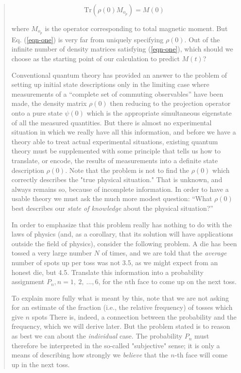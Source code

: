 \documentclass[]{article}
\begin{document}
\begin{quote}
\begin{equation}
\text{Tr}\left( \rho(0)M_{o_{p}} \right) = M(0) \label{eqn-one}
\end{equation}

where \(M_{o_p}\) is the operator corresponding to total magnetic moment. But Eq. (\ref{eqn-one}) is very far from uniquely
specifying \(\rho(0)\). Out of the infinite number of density matrices
satisfying (\ref{eqn-one}), which should we choose as the starting point of our
calculation to predict \(M(t)\)?

Conventional quantum theory has provided an answer to the problem of
setting up initial state descriptions only in the limiting case where
measurements of a ``complete set of commuting observables'' have been
made, the density matrix \(\rho(0)\) then reducing to the projection
operator onto a pure state \(\psi(0)\) which is the appropriate
simultaneous eigenstate of all the measured quantities. But there is
almost no experimental situation in which we really have all this
information, and before we have a theory able to treat actual
experimental situations, existing quantum theory must be supplemented
with some principle that tells us how to translate, or encode, the
results of measurements into a definite state description \(\rho(0)\).
Note that the problem is not to find the \(\rho(0)\) which correctly
describes the "true physical situation." That is unknown, and always
remains so, because of incomplete information. In order to have a usable
theory we must ask the much more modest question: ``What \(\rho(0)\) best
describes our \emph{state of knowledge} about the physical situation?''

In order to emphasize that this problem really has nothing to do with
the laws of physics (and, as a corollary, that its solution will have
applications outside the field of physics), consider the following
problem. A die has been tossed a very large number \(N\) of times, and
we are told that the \emph{average} number of spots up per toss was not
3.5, as we might expect from an honest die, but 4.5. Translate this
information into a probability assignment
\(P_{n},n = 1,\ 2,\ \ldots,6\), for the \(n\)th face to come up on the
next toss.

To explain more fully what is meant by this, note that we are not asking
for an estimate of the fraction (i.e., the relative frequency) of tosses
which give \(n\) spots There is, indeed, a connection between the
probability and the frequency, which we will derive later. But the
problem stated is to reason as best we can about the \emph{individual}
case. The probability \(P_{n}\) must therefore be interpreted in the
so-called "subjective" sense; it is only a means of describing how
strongly we \emph{believe} that the \(n\)-th face will come up in the
next toss.


\end{quote}
\end{document}

